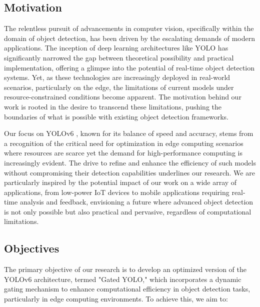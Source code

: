 


\subsection{Motivation}

The relentless pursuit of advancements in computer vision, specifically within the domain of object detection, has been driven by the escalating demands of modern applications. The inception of deep learning architectures like YOLO has significantly narrowed the gap between theoretical possibility and practical implementation, offering a glimpse into the potential of real-time object detection systems. Yet, as these technologies are increasingly deployed in real-world scenarios, particularly on the edge, the limitations of current models under resource-constrained conditions become apparent. The motivation behind our work is rooted in the desire to transcend these limitations, pushing the boundaries of what is possible with existing object detection frameworks.

Our focus on YOLOv6 \cite{li2022yolov6,li2023yolov6}, known for its balance of speed and accuracy, stems from a recognition of the critical need for optimization in edge computing scenarios where resources are scarce yet the demand for high-performance computing is increasingly evident. The drive to refine and enhance the efficiency of such models without compromising their detection capabilities underlines our research. We are particularly inspired by the potential impact of our work on a wide array of applications, from low-power IoT devices to mobile applications requiring real-time analysis and feedback, envisioning a future where advanced object detection is not only possible but also practical and pervasive, regardless of computational limitations.

\subsection{Objectives}

The primary objective of our research is to develop an optimized version of the YOLOv6 \cite{li2022yolov6,li2023yolov6} architecture, termed "Gated YOLO," which incorporates a dynamic gating mechanism to enhance computational efficiency in object detection tasks, particularly in edge computing environments. To achieve this, we aim to:

